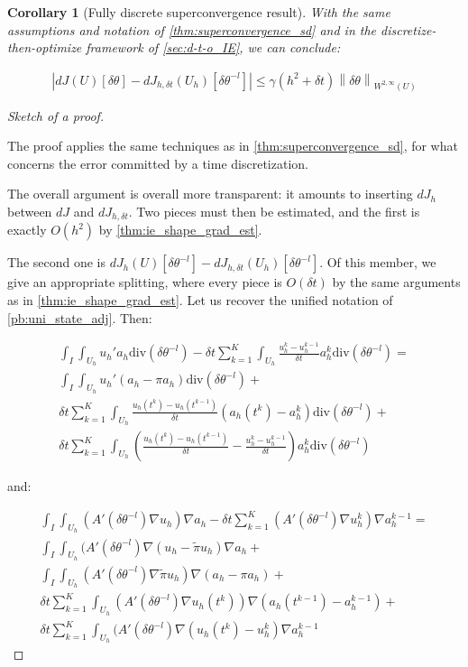 \documentclass[english,a4paper,9pt,oneside]{scrbook}	%
\theoremstyle{break}
\newtheorem{cor}[equation]{Corollary}
\newenvironment{mproof}[1][\proofname]{%
  \begin{proof}[#1]$ $\par\nobreak\ignorespaces
}{%
  \end{proof}
}
\renewcommand*{\proofname}{Proof}
\theoremstyle{remark}
\newcommand{\ds}{\displaystyle}
\newcommand{\norm}[1]{\left\lVert#1\right\rVert}
\newcommand{\te}{\theta}
\newcommand{\dive}{\text{div}}
\begin{document}
\begin{cor}[Fully discrete superconvergence result]
With the same assumptions and notation of \cref{thm:superconvergence_sd} and in the discretize-then-optimize framework of \cref{sec:d-t-o_IE}, we can conclude:  

\begin{align*}
	\left |dJ(U)[\delta \te] - dJ_{h,\delta t}(U_h)[\delta \te^{-l}] \right|\leq \gamma  (h^2 + \delta t)\norm{\delta \te}_{W^{2,\infty}(U)}
\end{align*}

\end{cor}
\begin{mproof}[Sketch of a proof]
The proof applies the same techniques as in \cref{thm:superconvergence_sd}, for what concerns the error committed by a time discretization.

The overall argument is overall more transparent: it amounts to inserting $dJ_h$ between $dJ$ and $dJ_{h,\delta t}$. Two pieces must then be estimated, and the first is exactly $O(h^2)$ by  \cref{thm:ie_shape_grad_est}.

The second one is $\ds dJ_h(U)[\delta \te^{-l}] - dJ_{h,\delta t}(U_h)[\delta \te^{-l}]$. Of this member, we give an appropriate splitting, where every piece is $O(\delta t)$ by the same arguments as in  \cref{thm:ie_shape_grad_est}. Let us recover the unified notation of \ref{pb:uni_state_adj}. Then:

\begin{align*}
	\int_I\int_{U_h}u_h'a_h\dive(\delta \te^{-l})-\delta t \sum_{k=1}^K \int_{U_h} \frac{u_h^k-u_h^{k-1}}{\delta t}a_h^k \dive(\delta \te^{-l})  =\\
	\int_I\int_{U_h}u_h'(a_h-\pi a_h)\dive(\delta \te^{-l})+\\
	\delta t \sum_{k=1}^K\int_{U_h}\frac{u_h(t^k)-u_h(t^{k-1})}{\delta t}(a_h(t^k)-a_h^k)\dive(\delta \te^{-l})+\\
	\delta t \sum_{k=1}^K \int_{U_h} \left (\frac{u_h(t^k)-u_h(t^{k-1})}{\delta t}-\frac{u_h^k-u_h^{k-1}}{\delta t}\right )a_h^k \dive(\delta \te^{-l})
\end{align*}

and:

\begin{align*}
	\int_I \int_{U_h} (A'(\delta \te^{-l})\nabla u_h)\nabla a_h - \delta t \sum_{k=1}^K (A'(\delta \te^{-l})\nabla u_h^k)\nabla a_h^{k-1} =  \\
	\int_I \int_{U_h} (A'(\delta \te^{-l})\nabla (u_h-\tilde{\pi} u_h)\nabla a_h + \\
	\int_I \int_{U_h} (A'(\delta \te^{-l})\nabla \tilde{\pi} u_h ) \nabla (a_h - \pi a_h) +\\
	\delta t \sum_{k=1}^K \int_{U_h} (A'(\delta \te^{-l})\nabla u_h(t^k) ) \nabla( a_h(t^{k-1})-a_h^{k-1}) +\\
	\delta t \sum_{k=1}^K \int_{U_h} (A'(\delta \te^{-l})\nabla (u_h(t^k)-u_h^k ) \nabla a_h^{k-1}
\end{align*}


\end{mproof}
\end{document}
